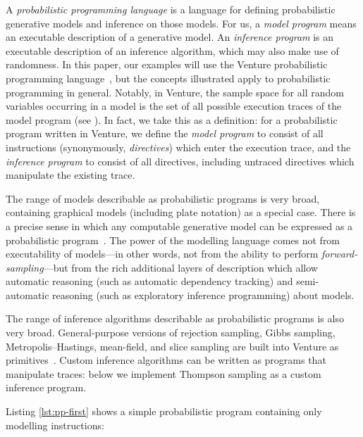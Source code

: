 A \emph{probabilistic programming language} is a language for defining
probabilistic generative models and inference on those models.  For us, a
\emph{model program} means an executable description of a generative model.  An
\emph{inference program} is an executable description of an inference algorithm,
which may also make use of randomness.  In this paper, our examples will use the
Venture probabilistic programming language~\citep{mansinghka2014venture}, but the concepts
illustrated apply to probabilistic programming in general.  Notably, in Venture,
the sample space for all random variables occurring in a model is the set of all
possible execution traces of the model program (see \citep[\S4]{mansinghka2014venture}).  In fact, we take this as a definition: for a
probabilistic program written in Venture, we define the \emph{model program} to
consist of all instructions (synonymously, \emph{directives}) which enter the
execution trace, and the \emph{inference program} to consist of all directives,
including untraced directives which manipulate the existing trace.

The range of models describable as probabilistic programs is very broad,
containing graphical models (including plate notation) as a special case.
There is a precise sense in which any computable generative model can be
expressed as a probabilistic program~\citep{ackerman2010computability}.  The power of the
modelling language comes not from executability of models---in other words,
not from the ability to perform \emph{forward-sampling}---but from the rich
additional layers of description which allow automatic reasoning (such as
automatic dependency tracking) and semi-automatic reasoning (such as
exploratory inference programming) about models.

The range of inference algorithms describable as probabilistic programs is also
very broad.  General-purpose versions of rejection sampling, Gibbs sampling,
Metropolis--Hastings, mean-field, and slice sampling are built into Venture as
primitives~\citep{mansinghka2014venture}.  Custom inference algorithms can be written as
programs that manipulate traces: below we implement Thompson sampling as a
custom inference program.

Listing \ref{lst:pp-first} shows a simple probabilistic program containing only
modelling instructions:
\begin{mdframed}
\begin{minipage}{\linewidth}
\small
\belowcaptionskip=-10pt

\end{minipage}
\end{mdframed}     

